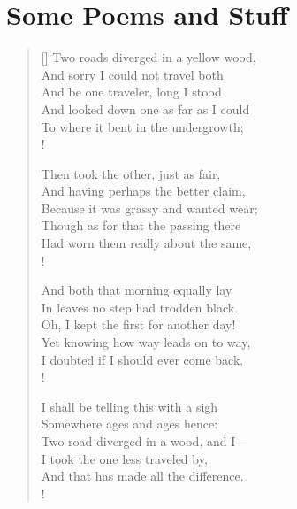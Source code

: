 \documentclass[../butidigress.tex]{subfiles}
\begin{document}
\chapter{Some Poems and Stuff}
\newpage

\setlength{\versewidth}{39ex}
\begin{verse}[\versewidth]
Two roads diverged in a yellow wood, \\
And sorry I could not travel both \\
And be one traveler, long I stood \\
And looked down one as far as I could \\
To where it bent in the undergrowth; \\!

Then took the other, just as fair, \\
And having perhaps the better claim, \\
Because it was grassy and wanted wear; \\
Though as for that the passing there \\
Had worn them really about the same, \\!

And both that morning equally lay \\
In leaves no step had trodden black. \\
Oh, I kept the first for another day! \\
Yet knowing how way leads on to way, \\
I doubted if I should ever come back. \\!

I shall be telling this with a sigh \\
Somewhere ages and ages hence: \\
Two road diverged in a wood, and I--- \\
I took the one less traveled by, \\
And that has made all the difference. \\!
\end{verse}

\newpage
\end{document}
